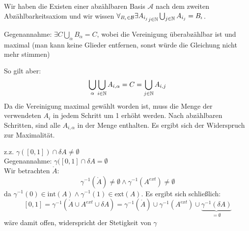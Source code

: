 \documentclass{scrartcl}
\begin{document}
\begin{aufgabe}
Wir haben die Existen einer abzählbaren Basis $ \mathcal A $ nach dem zweiten Abzählbarkeitsaxiom und wir wissen $ \forall_{B_\iota\in \mathcal B} \exists {A_{i_j}}_{j\in \mathbb{N}} \bigcup_{j\in \mathbb{N}} A_{i_j}=B_\iota $.

Gegenannahme: $ \exists C \bigcup_\alpha B_\alpha=C $, wobei die Vereinigung überabzählbar ist und maximal (man kann keine Glieder entfernen, sonst würde die Gleichung nicht mehr stimmen)

So gilt aber:
\[
\bigcup_\alpha \bigcup_{i\in \mathbb{N}} A_{i,\alpha}=C=\bigcup_{j\in \mathbb{N}}A_{i,j}
\]
Da die Vereinigung maximal gewählt worden ist, muss die Menge der verwendeten $ A_i $ in jedem Schritt um 1 erhöht werden. Nach abzählbaren Schritten, sind alle $ A_{i,\alpha} $ in der Menge enthalten.  Es ergibt sich der Widerspruch zur Maximalität.
\end{aufgabe}
\begin{aufgabe}
z.z. $ \gamma([0,1])\cap \delta{A} \neq \emptyset $\\
Gegenannahme: $ \gamma([0,1]\cap \delta A=\emptyset $\\
Wir betrachten $ \mathring{A} $:
\[
\gamma^{-1}(\mathring{A})\neq \emptyset \land \gamma^{-1}(A^{ext})\neq \emptyset
\]
da $ \gamma^{-1}(0)\in \text{int}(A) \land \gamma^{-1}(1) \in \text{ext}(A) $. Es ergibt sich schließlich:
\[
[0,1]=
\gamma^{-1}(\mathring A\cup A^{ext}\cup \delta A)=\gamma^{-1}(\mathring A)\cup \gamma^{-1}(A^{ext})\cup \underbrace{ \gamma^{-1}(\delta A)}_{=\emptyset}
\]
wäre damit offen, widerspricht der Stetigkeit von $ \gamma $
\end{aufgabe}
\end{document}
